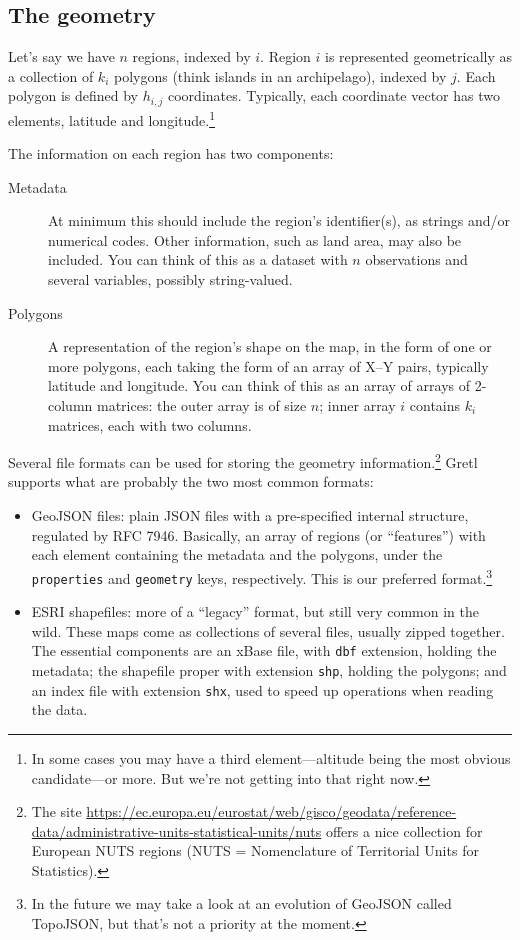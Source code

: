 \documentclass{article}
\begin{document}
\subsection{The geometry}
\label{sec:geometry}

Let's say we have $n$ regions, indexed by $i$. Region $i$ is
represented geometrically as a collection of $k_i$ polygons (think
islands in an archipelago), indexed by $j$. Each polygon is defined by
$h_{i,j}$ coordinates. Typically, each coordinate vector has two
elements, latitude and longitude.\footnote{In some cases you may have
  a third element---altitude being the most obvious candidate---or
  more.  But we're not getting into that right now.}

The information on each region has two components:
\begin{description}
\item[Metadata] At minimum this should include the region's
  identifier(s), as strings and/or numerical codes. Other information,
  such as land area, may also be included. You can think of this as a
  dataset with $n$ observations and several variables, possibly
  string-valued.
\item[Polygons] A representation of the region's shape on the map, in
  the form of one or more polygons, each taking the form of an array
  of X--Y pairs, typically latitude and longitude. You can think of
  this as an array of arrays of 2-column matrices: the outer array is
  of size $n$; inner array $i$ contains $k_i$ matrices, each with two
  columns.
\end{description}

Several file formats can be used for storing the geometry
information.\footnote{The site
\url{https://ec.europa.eu/eurostat/web/gisco/geodata/reference-data/administrative-units-statistical-units/nuts}
offers a nice collection for European NUTS regions (NUTS =
Nomenclature of Territorial Units for Statistics).}
Gretl supports what are probably the two most common formats:
\begin{itemize}
\item GeoJSON files: plain JSON files with a pre-specified internal
  structure, regulated by RFC 7946. Basically, an array of regions (or
  ``features'') with each element containing the metadata and the
  polygons, under the \texttt{properties} and \texttt{geometry} keys,
  respectively.  This is our preferred format.\footnote{In the future
    we may take a look at an evolution of GeoJSON called TopoJSON, but
    that's not a priority at the moment.}
\item ESRI shapefiles: more of a ``legacy'' format, but still very
  common in the wild. These maps come as collections of several files,
  usually zipped together. The essential components are an
  \textsf{xBase} file, with \texttt{dbf} extension, holding the
  metadata; the shapefile proper with extension \texttt{shp}, holding
  the polygons; and an index file with extension \texttt{shx}, used
  to speed up operations when reading the data.
\end{itemize}
\end{document}
